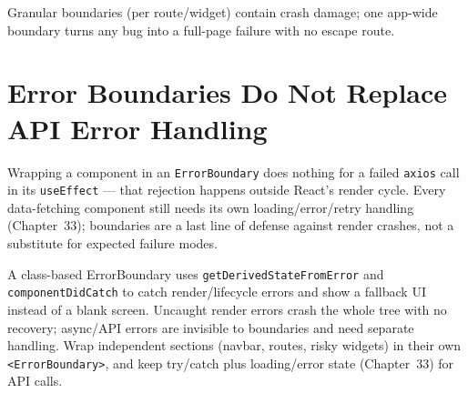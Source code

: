 \begin{tipbox}[TIP]
Granular boundaries (per route/widget) contain crash damage; one app-wide
boundary turns any bug into a full-page failure with no escape route.
\end{tipbox}

\section{Error Boundaries Do Not Replace API Error Handling}

Wrapping a component in an \texttt{ErrorBoundary} does nothing for a failed
\texttt{axios} call in its \texttt{useEffect} --- that rejection happens
outside React's render cycle. Every data-fetching component still needs
its own loading/error/retry handling (Chapter~33); boundaries are a last
line of defense against render crashes, not a substitute for expected
failure modes.

\whatwhyhow
{A class-based ErrorBoundary uses \texttt{getDerivedStateFromError} and \texttt{componentDidCatch} to catch render/lifecycle errors and show a fallback UI instead of a blank screen.}
{Uncaught render errors crash the whole tree with no recovery; async/API errors are invisible to boundaries and need separate handling.}
{Wrap independent sections (navbar, routes, risky widgets) in their own \texttt{<ErrorBoundary>}, and keep try/catch plus loading/error state (Chapter~33) for API calls.}
